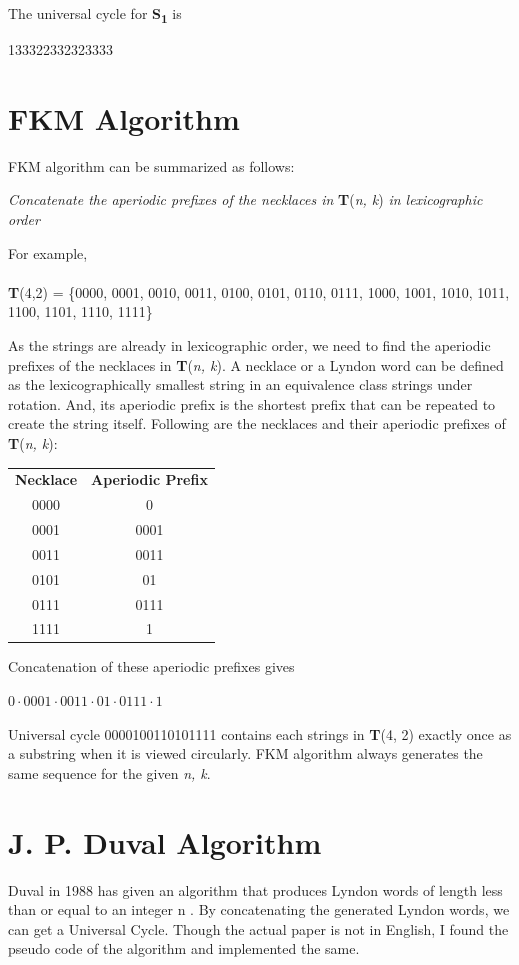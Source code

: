 \documentclass[12pt,twoside]{article}
\begin{document}
The universal cycle for \textbf{S\textsubscript{1}} is \begin{center} 133322332323333 \end{center}

\section{FKM Algorithm}
FKM algorithm can be summarized as follows: \begin{center} \emph{Concatenate the aperiodic prefixes of the necklaces in} \textbf{T}(\emph{n, k}) \emph{in lexicographic order}\end{center}
For example, \\ \\\textbf{T}(4,2) = \{0000, 0001, 0010, 0011, 0100, 0101, 0110, 0111, 1000, 1001, 1010, 1011, 1100, 1101, 1110, 1111\}

As the strings are already in lexicographic order, we need to find the aperiodic prefixes of the necklaces in \textbf{T}(\emph{n, k}). A necklace or a Lyndon word can be defined as the lexicographically smallest string in an equivalence class strings under rotation. And, its aperiodic prefix is the shortest prefix that can be repeated to create the string itself. Following are the necklaces and their aperiodic prefixes of \textbf{T}(\emph{n, k}):
\begin{center}
\begin{tabular}{ c c }
 \textbf{Necklace} & \textbf{Aperiodic Prefix} \\ 
 0000 & 0 \\  
 0001 & 0001 \\
 0011 & 0011 \\
 0101 & 01 \\
 0111 & 0111\\
 1111 & 1\\    
\end{tabular}
\end{center}
Concatenation of these aperiodic prefixes gives \begin{center}$0\cdot0001\cdot0011\cdot01\cdot0111\cdot1$\end{center}
Universal cycle 0000100110101111 contains each strings in \textbf{T}(4, 2) exactly once as a substring when it is viewed circularly. FKM algorithm always generates the same sequence for the given \emph{n, k}.

\section{J. P. Duval Algorithm}
Duval in 1988 has given an algorithm that produces Lyndon words of length less than or equal to an integer n \cite{Duval}. By concatenating the generated Lyndon words, we can get a Universal Cycle. Though the actual paper is not in English, I found the pseudo code of the algorithm \cite{Chemillier} and implemented the same. 
\hfill \break
\hfill \break
\hfill \break
\hfill \break
\hfill \break
\hfill \break
\end{document}
